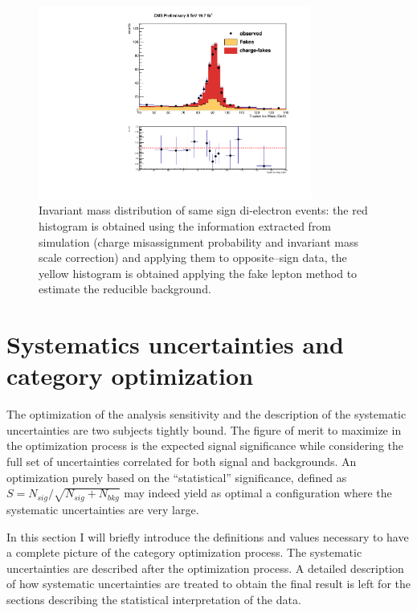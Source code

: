\begin{figure}
  \begin{center}
  \includegraphics[width=0.8\textwidth]{4_Analisys/pics/8TeV/plots/zee/EE_Charge_Flip_xcheck_trk_invMass.pdf}
  \caption{Invariant mass distribution of same sign di-electron events: the red histogram is obtained using the information extracted from simulation
(charge misassignment probability and invariant mass scale correction) and applying them to opposite--sign data, the yellow histogram is obtained applying the fake lepton method to estimate the reducible background.}
  \label{fig:control_Zee}
  \end{center}
\end{figure}

\section{Systematics uncertainties and category optimization}
\label{sec:systematics}

The optimization of the analysis sensitivity and the description of the systematic uncertainties are two subjects tightly bound. The figure of merit to maximize in the optimization process is the expected signal significance while considering the full set of uncertainties correlated for both signal and backgrounds. An optimization purely based on the ``statistical'' significance, defined as $S = N_{sig} / \sqrt{N_{sig} + N_{bkg}}$ may indeed yield as optimal a configuration where the systematic uncertainties are very large.

In this section I will briefly introduce the definitions and values necessary to have a complete picture of the category optimization process. The systematic uncertainties are described after the optimization process.
A detailed description of how systematic uncertainties are treated to obtain the final result is left for the sections describing the statistical interpretation of the data.

